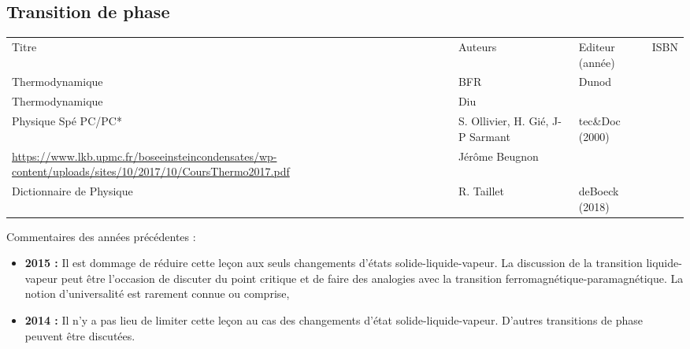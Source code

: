 \begin{headerBlock}
  \chapter{Transition de phase}
  \label{LP_TransitionPhase} 
\end{headerBlock}




\begin{center}
\begin{tabularx}{\textwidth}{| X | X | X | c |}
  \hline
  \rowcolor{gray!20}\multicolumn{4}{c}{Bibliographie de la leçon : } \\
  \hline 
  Titre & Auteurs & Editeur (année) & ISBN \\
  \hline
  Thermodynamique & BFR & Dunod & \\
  \hline 
  Thermodynamique & Diu &  &    \\
  \hline 
  Physique Spé PC/PC* & S. Ollivier, H. Gié, J-P Sarmant & tec\&Doc (2000) &   \\
  \hline 
  \url{https://www.lkb.upmc.fr/boseeinsteincondensates/wp-content/uploads/sites/10/2017/10/CoursThermo2017.pdf} & Jérôme Beugnon & & \\
  \hline
  Dictionnaire de Physique & R. Taillet & deBoeck (2018) & \\
  \hline
\end{tabularx}
\end{center}

\begin{reportBlock}{Commentaires des années précédentes :}
    \begin{itemize}
        \item \textbf{2015 :} Il est dommage de réduire cette leçon aux seuls changements d’états solide-liquide-vapeur. La discussion de la transition liquide-vapeur peut être l’occasion de discuter du point critique et de faire des analogies avec la transition ferromagnétique-paramagnétique. La notion d’universalité est rarement connue ou comprise,
        \item \textbf{2014 :} Il n’y a pas lieu de limiter cette leçon au cas des changements d’état solide-liquide-vapeur. D’autres transitions de phase peuvent être discutées.
    \end{itemize}
\end{reportBlock}


